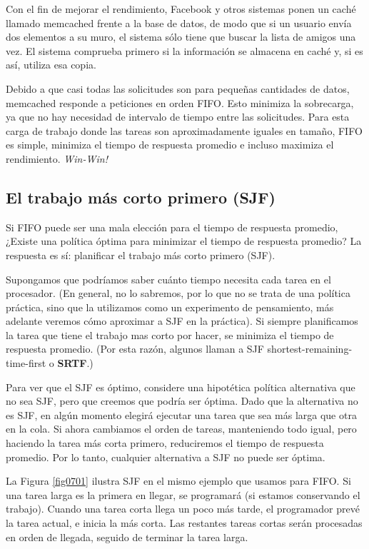 \documentclass[10pt]{book}
\begin{document}
Con el fin de mejorar el rendimiento, Facebook y otros sistemas ponen un caché llamado memcached frente a la base de datos, de modo que si un usuario envía dos elementos a su muro, el sistema sólo tiene que buscar la lista de amigos una vez. El sistema comprueba primero si la información se almacena en caché y, si es así, utiliza esa copia.

Debido a que casi todas las solicitudes son para pequeñas cantidades de datos, memcached responde a peticiones en orden FIFO. Esto minimiza la sobrecarga, ya que no hay necesidad de intervalo de tiempo entre las solicitudes. Para esta carga de trabajo donde las tareas son aproximadamente iguales en tamaño, FIFO es simple, minimiza el tiempo de respuesta promedio e incluso maximiza el rendimiento. \textit{Win-Win!}

\subsection{El trabajo más corto primero (SJF)}
Si FIFO puede ser una mala elección para el tiempo de respuesta promedio, ¿Existe una política óptima para minimizar el tiempo de respuesta promedio? La respuesta es sí: planificar el trabajo más corto primero (SJF).

Supongamos que podríamos saber cuánto tiempo necesita cada tarea en el procesador. (En general, no lo sabremos, por lo que no se trata de una política práctica, sino que la utilizamos como un experimento de pensamiento, más adelante veremos cómo aproximar a SJF en la práctica). Si siempre planificamos la tarea que tiene el trabajo mas corto por hacer, se minimiza el tiempo de respuesta promedio. (Por esta razón, algunos llaman a SJF shortest-remaining-time-first o \textbf{SRTF}.)

Para ver que el SJF es óptimo, considere una hipotética política alternativa que no sea SJF, pero que creemos que podría ser óptima. Dado que la alternativa no es SJF, en algún momento elegirá ejecutar una tarea que sea más larga que otra en la cola. Si ahora cambiamos el orden de tareas, manteniendo todo igual, pero haciendo la tarea más corta primero, reduciremos el tiempo de respuesta promedio. Por lo tanto, cualquier alternativa a SJF no puede ser óptima.

La Figura \ref{fig0701} ilustra SJF en el mismo ejemplo que usamos para FIFO. Si una tarea larga es la primera en llegar, se programará (si estamos conservando el trabajo). Cuando una tarea corta llega un poco más tarde, el programador prevé la tarea actual, e inicia la más corta. Las restantes tareas cortas serán procesadas en orden de llegada, seguido de terminar la tarea larga.
\end{document}
